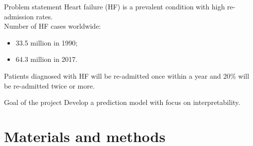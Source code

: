 \documentclass[aspectratio=169,xcolor=dvipsnames]{beamer}
\begin{document}
\begin{frame}{Problem statement}
    Heart failure (HF) is a prevalent condition with high re-admission rates.\\
    Number of HF cases worldwide:
    \begin{itemize}
        \item 33.5 million in 1990;
        \item 64.3 million in 2017.
    \end{itemize}
    
    Patients diagnosed with HF will be re-admitted once within a year and 20\% will be re-admitted twice or more.

    \begin{block}{Goal of the project}
        Develop a prediction model with focus on interpretability.
    \end{block}

\end{frame}



\section{Materials and methods}

\end{document}
